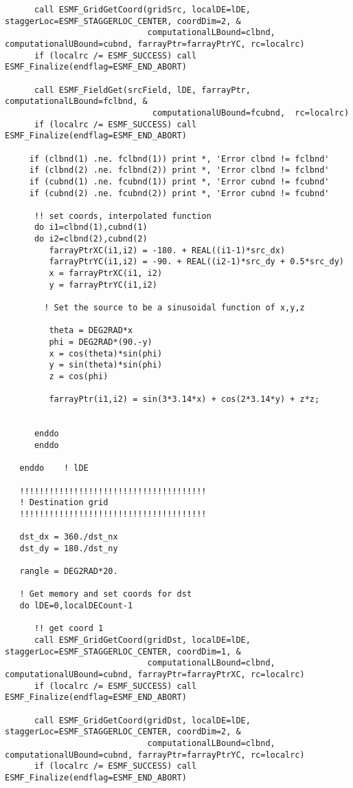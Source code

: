\begin{verbatim}
      call ESMF_GridGetCoord(gridSrc, localDE=lDE, staggerLoc=ESMF_STAGGERLOC_CENTER, coordDim=2, &
                             computationalLBound=clbnd, computationalUBound=cubnd, farrayPtr=farrayPtrYC, rc=localrc)
      if (localrc /= ESMF_SUCCESS) call ESMF_Finalize(endflag=ESMF_END_ABORT)
 
      call ESMF_FieldGet(srcField, lDE, farrayPtr, computationalLBound=fclbnd, &
                              computationalUBound=fcubnd,  rc=localrc)
      if (localrc /= ESMF_SUCCESS) call ESMF_Finalize(endflag=ESMF_END_ABORT)
 
     if (clbnd(1) .ne. fclbnd(1)) print *, 'Error clbnd != fclbnd'
     if (clbnd(2) .ne. fclbnd(2)) print *, 'Error clbnd != fclbnd'
     if (cubnd(1) .ne. fcubnd(1)) print *, 'Error cubnd != fcubnd'
     if (cubnd(2) .ne. fcubnd(2)) print *, 'Error cubnd != fcubnd'
 
      !! set coords, interpolated function
      do i1=clbnd(1),cubnd(1)
      do i2=clbnd(2),cubnd(2)
         farrayPtrXC(i1,i2) = -180. + REAL((i1-1)*src_dx)
         farrayPtrYC(i1,i2) = -90. + REAL((i2-1)*src_dy + 0.5*src_dy)
         x = farrayPtrXC(i1, i2)
         y = farrayPtrYC(i1,i2)
      
        ! Set the source to be a sinusoidal function of x,y,z
 
         theta = DEG2RAD*x
         phi = DEG2RAD*(90.-y)
         x = cos(theta)*sin(phi)
         y = sin(theta)*sin(phi)
         z = cos(phi)
 
         farrayPtr(i1,i2) = sin(3*3.14*x) + cos(2*3.14*y) + z*z;
 
 
      enddo
      enddo
 
   enddo    ! lDE
 
   !!!!!!!!!!!!!!!!!!!!!!!!!!!!!!!!!!!!!!
   ! Destination grid
   !!!!!!!!!!!!!!!!!!!!!!!!!!!!!!!!!!!!!!
 
   dst_dx = 360./dst_nx
   dst_dy = 180./dst_ny
 
   rangle = DEG2RAD*20.
 
   ! Get memory and set coords for dst
   do lDE=0,localDECount-1
  
      !! get coord 1
      call ESMF_GridGetCoord(gridDst, localDE=lDE, staggerLoc=ESMF_STAGGERLOC_CENTER, coordDim=1, &
                             computationalLBound=clbnd, computationalUBound=cubnd, farrayPtr=farrayPtrXC, rc=localrc)
      if (localrc /= ESMF_SUCCESS) call ESMF_Finalize(endflag=ESMF_END_ABORT)
 
      call ESMF_GridGetCoord(gridDst, localDE=lDE, staggerLoc=ESMF_STAGGERLOC_CENTER, coordDim=2, &
                             computationalLBound=clbnd, computationalUBound=cubnd, farrayPtr=farrayPtrYC, rc=localrc)
      if (localrc /= ESMF_SUCCESS) call ESMF_Finalize(endflag=ESMF_END_ABORT)
 

\end{verbatim}
